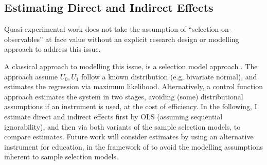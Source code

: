 \subsection{Estimating Direct and Indirect Effects}

Quasi-experimental work does not take the assumption of ``selection-on-observables'' at face value without an explicit research design \citep{angrist2009mostly} or modelling approach to address this issue.

A classical approach to modelling this issue, is a selection model approach \citep{heckman1974shadow,heckman1979sample}.
The approach assume $U_0, U_1$ follow a known distribution (e.g, bivariate normal), and estimates the regression via maximum likelihood.
Alternatively, a control function approach estimates the system in two stages, avoiding (some) distributional assumptions if an instrument is used, at the cost of efficiency.
In the following, I estimate direct and indirect effects first by OLS (assuming sequential ignorability), and then via both variants of the sample selection models, to compare estimates.
Future work will consider estimates by using an alternative instrument for education, in the framework of \cite{frolich2017direct} to avoid the modelling assumptions inherent to sample selection models.
